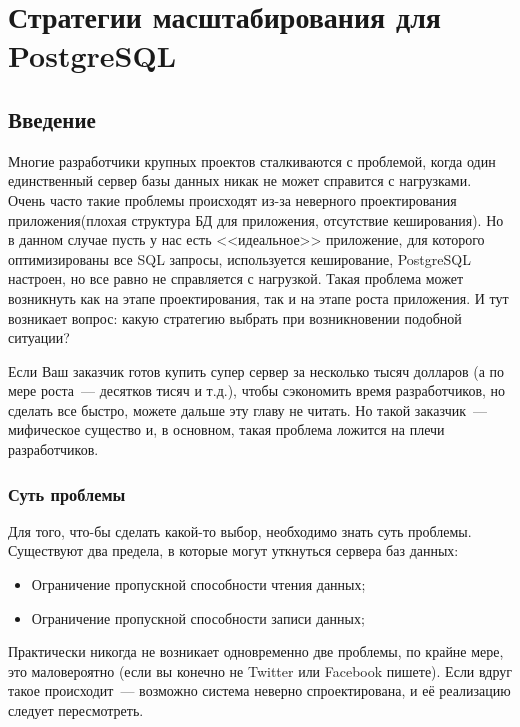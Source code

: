 \chapter{Стратегии масштабирования для PostgreSQL}
\begin{epigraphs}
\end{epigraphs}

\section{Введение}
Многие разработчики крупных проектов сталкиваются с проблемой, когда один единственный сервер 
базы данных никак не может справится с нагрузками. Очень часто такие проблемы происходят из-за 
неверного проектирования приложения(плохая структура БД для приложения, отсутствие кеширования). Но в данном 
случае пусть у нас есть <<идеальное>> приложение, для которого оптимизированы все SQL запросы, используется кеширование, 
PostgreSQL настроен, но все равно не справляется с нагрузкой. Такая проблема может возникнуть как на этапе проектирования, 
так и на этапе роста приложения. И тут возникает вопрос: какую стратегию выбрать при возникновении подобной ситуации?

Если Ваш заказчик готов купить супер сервер за несколько тысяч долларов 
(а по мере роста~--- десятков тисяч и т.д.), чтобы сэкономить время разработчиков, но сделать все быстро, 
можете дальше эту главу не читать. Но такой заказчик~--- мифическое существо и, в основном, такая проблема 
ложится на плечи разработчиков.

\subsection{Суть проблемы}

Для того, что-бы сделать какой-то выбор, необходимо знать суть проблемы. 
Существуют два предела, в которые могут уткнуться сервера баз данных:

\begin{itemize}
\item Ограничение пропускной способности чтения данных;
\item Ограничение пропускной способности записи данных;
\end{itemize}

Практически никогда не возникает одновременно две проблемы, по крайне мере, это маловероятно (если вы конечно не Twitter 
или Facebook пишете). Если вдруг такое происходит~--- возможно система неверно спроектирована, и её реализацию следует пересмотреть.


